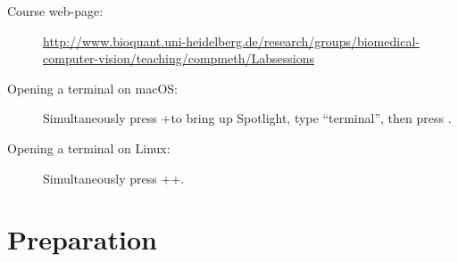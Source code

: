 \documentclass[12pt,a4paper]{article}
\let\AltKey=\Alt
\let\Alt=\relax
\begin{document}
\begin{description}
\item[Course web-page:] \begin{sloppypar}\url{http://www.bioquant.uni-heidelberg.de/research/groups/biomedical-computer-vision/teaching/compmeth/Labsessions}\end{sloppypar}
\item[Opening a terminal on macOS:] Simultaneously press \keystroke{\cmd}+\Spacebar to bring up Spotlight, type ``terminal'', then press \Return.
\item[Opening a terminal on Linux:] Simultaneously press \Ctrl+\AltKey+.
\end{description}

\section{Preparation}
\label{task:preparation}
\end{document}
